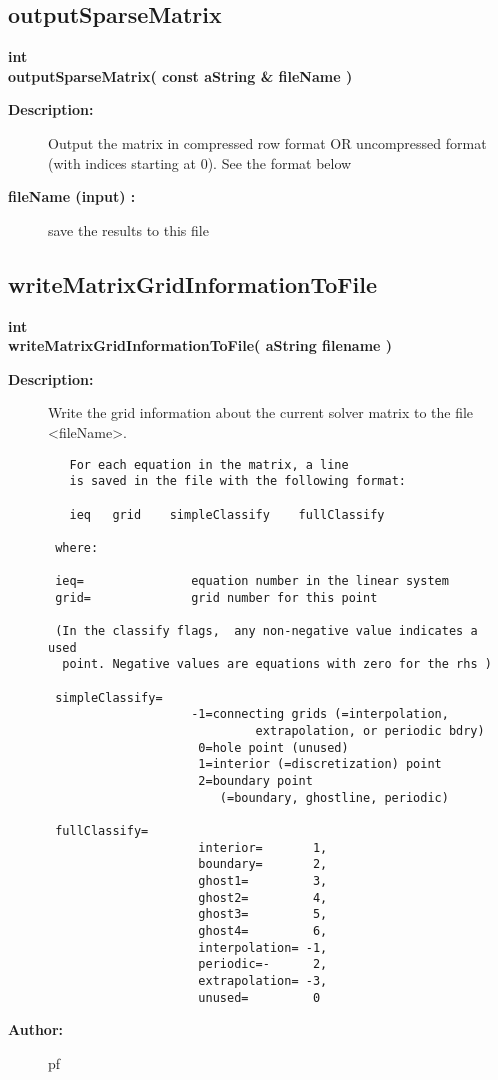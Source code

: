 \subsection{outputSparseMatrix}
 
\begin{flushleft} \textbf{%
int  \\ 
\settowidth{\OgesIncludeArgIndent}{outputSparseMatrix(}%
outputSparseMatrix( const aString \& fileName )
}\end{flushleft}
\begin{description}
\item[{\bf Description:}] 
   Output the matrix in compressed row format OR uncompressed format (with indices starting at 0). 
 See the format below
\item[{\bf fileName (input) :}]  save the results to this file
\end{description}
\subsection{writeMatrixGridInformationToFile}
 
\begin{flushleft} \textbf{%
int  \\ 
\settowidth{\OgesIncludeArgIndent}{writeMatrixGridInformationToFile(}%
writeMatrixGridInformationToFile( aString filename )
}\end{flushleft}
\begin{description}
\item[{\bf Description:}] 
   Write the grid information about the current solver matrix 
   to the file <fileName>.
   
 \begin{verbatim}
   For each equation in the matrix, a line
   is saved in the file with the following format:

   ieq   grid    simpleClassify    fullClassify

 where:

 ieq=               equation number in the linear system
 grid=              grid number for this point

 (In the classify flags,  any non-negative value indicates a used 
  point. Negative values are equations with zero for the rhs )

 simpleClassify=  
                    -1=connecting grids (=interpolation, 
                             extrapolation, or periodic bdry)
                     0=hole point (unused)
                     1=interior (=discretization) point
                     2=boundary point 
                        (=boundary, ghostline, periodic)

 fullClassify=      
                     interior=       1,
                     boundary=       2,
                     ghost1=         3,
                     ghost2=         4,
                     ghost3=         5,
                     ghost4=         6,
                     interpolation= -1,
                     periodic=-      2,
                     extrapolation= -3,
                     unused=         0
 \end{verbatim}

\item[{\bf Author:}]  pf
\end{description}
